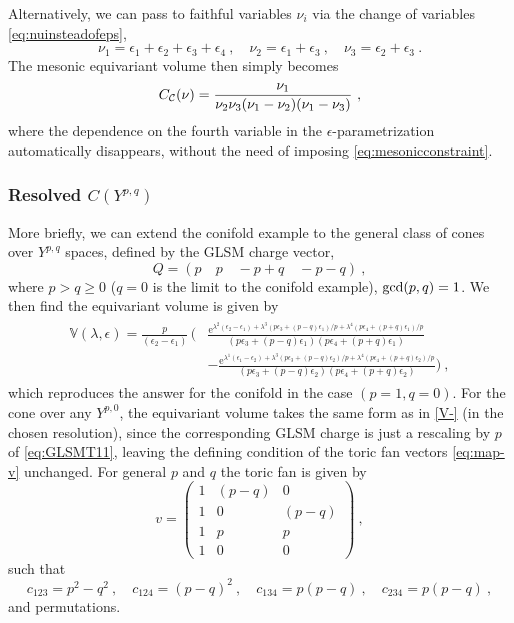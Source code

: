 \documentclass[11pt,a4paper]{article}
\def\cC{{\cal C}}
\theoremstyle{definition}
\theoremstyle{identity}
\theoremstyle{remark}
\newcommand{\be}{\begin{equation}}
\newcommand{\ee}{\end{equation}}
\newcommand{\bea}{\begin{eqnarray}}
\newcommand{\eea}{\end{eqnarray}}
\newcommand{\mathe}{\mathrm{e}}
\newcommand{\e}{\epsilon}
\newcommand{\lam}{\lambda}
\newcommand{\BV}{\mathbb{V}}
\begin{document}
Alternatively, we can pass to faithful variables $\nu_i$ via the change of variables \eqref{eq:nuinsteadofeps},
\be
\label{eq:conifoldidentity}
    \nu_1 = \e_1+\e_2+\e_3+\e_4\ ,
 \quad
 \nu_2 = \e_1+\e_3\ ,
 \quad
 \nu_3 = \e_2+\e_3\ .
\ee
The mesonic equivariant volume then simply becomes
\be
    C_\cC (\nu) = \frac{\nu_1}{\nu_2 \nu_3 (\nu_1 - \nu_2) (\nu_1 - \nu_3)} \ ,
\ee
where the dependence on the fourth variable in the $\e$-parametrization automatically disappears, without the need of imposing \eqref{eq:mesonicconstraint}. 

\subsubsection*{Resolved $C(Y^{p,q})$}
More briefly, we can extend the conifold example to the general class of cones over $Y^{p,q}$ spaces, defined by the GLSM charge vector, \cite{Gauntlett:2004hh,Martelli:2004wu,Benvenuti:2004dy}
\be
    Q = (p \quad p\quad -p+q \quad -p-q)\ ,
\ee
where $p > q \geq 0$ ($q=0$ is the limit to the conifold example), ${\rm gcd} (p,q) = 1$.
We then find the equivariant volume is given by
\bea
\begin{split}
 \BV (\lam, \e) = \frac{p}{(\e_2-\e_1)}\, \Big(&
 \frac{\mathe^{\lam^2 (\e_2-\e_1)+\lam^3 (p \e_3+(p-q) \e_1)/p +\lam^4 (p\e_4+ (p+q)\e_1)/p}}
 {(p \e_3+ (p-q) \e_1) (p\e_4+(p+q) \e_1)} \\
 &- \frac{\mathe^{\lam^1 (\e_1-\e_2)+\lam^3 (p \e_3+(p-q)\e_2)/p +\lam^4 (p\e_4+(p+q)\e_2)/p}}
 {(p\e_3+(p-q)\e_2) (p\e_4+(p+q)\e_2)} \Big)\ ,
 \end{split}
\eea
which reproduces the answer for the conifold in the case $(p=1, q=0)$. For the cone over any $Y^{p,0}$, the equivariant volume takes the same form as in \eqref{V-} (in the chosen resolution), since the corresponding GLSM charge is just a rescaling by $p$ of \eqref{eq:GLSMT11}, leaving the defining condition of the toric fan vectors \eqref{eq:map-v} unchanged. For general $p$ and $q$ the toric fan is given by
\be
 v =
 \begin{pmatrix}
 1 & (p-q) & 0 \\
 1 & 0 & (p-q) \\
 1 & p & p \\
 1 & 0 & 0
 \end{pmatrix}\ ,
\ee
such that
\be
    c_{123} = p^2-q^2\ , \quad  c_{124} = (p-q)^2\ , \quad c_{134} = p (p-q)\ , \quad c_{234} = p (p-q)\ ,
\ee
and permutations.
\end{document}
